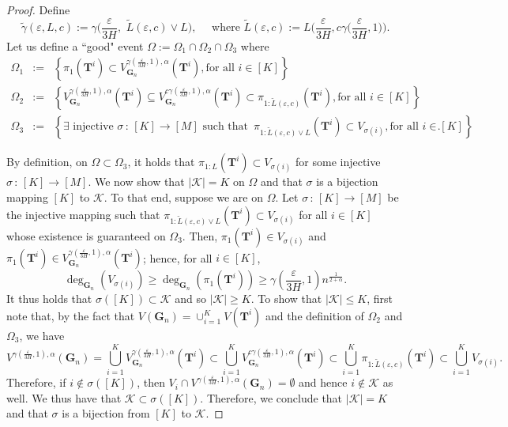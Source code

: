 \documentclass[twoside,11pt]{article}
\theoremstyle{remark}
\begin{document}
\begin{proof}
Define
\[
\tilde{\gamma}(\varepsilon, L, c) := \gamma\biggl( \frac{\varepsilon}{3H},\,\, \tilde{L}(\varepsilon, c) \vee L \biggr), \quad \text{ where } \tilde{L}(\varepsilon, c) := L\biggl( \frac{\varepsilon}{3H}, c \gamma\biggl( \frac{\varepsilon}{3H}, 1 \biggr) \biggr).
\]
Let us define a ``good" event $
    \Omega := \Omega_1\cap\Omega_2\cap \Omega_3$ where
%
\begin{eqnarray*}
   \Omega_1&:=& \left\{\pi_{1}(\boldsymbol{T}^i)\subset V^{\gamma( \frac{\varepsilon}{3H}, 1 ), \alpha}_{\boldsymbol{G}_n}(\boldsymbol{T}^i), \text{for all $i \in \left[K\right]$}\right\} \\
   \Omega_2&:=& \left\{V^{\gamma( \frac{\varepsilon}{3H}, 1 ), \alpha}_{\boldsymbol{G}_n}(\boldsymbol{T}^i) \subseteq V^{ c\gamma( \frac{\varepsilon}{3H}, 1 ), \alpha}_{\boldsymbol{G}_n}(\boldsymbol{T}^i)\subset \pi_{1:\tilde{L}(\varepsilon, c)}(\boldsymbol{T}^i), \text{for all $i \in \left[K\right]$}\right\}\\
   \Omega_3&:=& \left\{ \exists \text{ injective } \sigma \,:\, [K] \rightarrow [M] \text{ such that }\, \pi_{1:{\tilde{L}(\varepsilon, c)} \vee L }(\boldsymbol{T}^{i})\subset V_{\sigma(i)},  \text{for all $i \in \left[K\right]$}\right\}.
\end{eqnarray*}

By definition, on $\Omega \subset \Omega_3$, it holds that $\pi_{1:L}(\bm{T}^i) \subset V_{\sigma(i)}$ for some injective $\sigma \,:\, [K] \rightarrow [M]$. We now show that $| \mathcal{K} | = K$ on $\Omega$ and that $\sigma$ is a bijection mapping $[K]$ to $\mathcal{K}$. To that end, suppose we are on $\Omega$. Let $\sigma \,:\, [K] \rightarrow [M]$ be the injective mapping such that $\pi_{1:{\tilde{L}(\varepsilon, c)} \vee L }(\boldsymbol{T}^i)\subset V_{\sigma(i)}$ for all $i \in [K]$ whose existence is guaranteed on $\Omega_3$. Then, $\pi_1(\bm{T}^i) \in V_{\sigma(i)}$ and $\pi_1(\bm{T}^i) \in V_{\bm{G}_n}^{{\gamma( \frac{\varepsilon}{3H}, 1 )}, \alpha}(\bm{T}^i)$; hence, for all $i \in [K]$,
\[
\operatorname{deg}_{\bm{G}_n}(V_{\sigma(i)}) \geq \operatorname{deg}_{\bm{G}_n}(\pi_1(\bm{T}^i)) \geq {\gamma( \frac{\varepsilon}{3H}, 1 )} n^{\frac{1}{2+\alpha}}.
\]
It thus holds that $\sigma([K]) \subset \mathcal{K}$ and so $|\mathcal{K}| \geq K$. To show that $|\mathcal{K}| \leq K$, first note that, 
by the fact that $V(\bm{G}_n) = \cup_{i=1}^K V(\bm{T}^i)$ and the definition of $\Omega_2$ and $\Omega_3$, we have
\[
V^{{\gamma( \frac{\varepsilon}{3H}, 1 )}, \alpha}(\bm{G}_n) = \bigcup_{i=1}^K V_{\bm{G}_n}^{{\gamma( \frac{\varepsilon}{3H}, 1 )}, \alpha}(\bm{T}^i) \subset \bigcup_{i=1}^K V_{\bm{G}_n}^{{c\gamma( \frac{\varepsilon}{3H}, 1 )}, \alpha}(\bm{T}^i) \subset \bigcup_{i=1}^K \pi_{1:{\tilde{L}(\varepsilon, c)} }(\bm{T}^i) \subset \bigcup_{i=1}^K V_{\sigma(i)}.
\]
Therefore, if $i \notin \sigma([K])$, then $V_i \cap V^{{\gamma( \frac{\varepsilon}{3H}, 1 )}, \alpha}(\bm{G}_n) = \emptyset$ and hence $i \notin \mathcal{K}$ as well. We thus have that $\mathcal{K} \subset \sigma([K])$. Therefore, we conclude that $|\mathcal{K}| = K$ and that $\sigma$ is a bijection from $[K]$ to $\mathcal{K}$.  
 


\end{proof}
\end{document}
